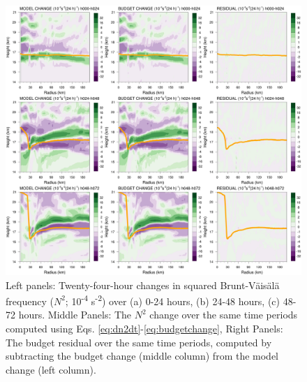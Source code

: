 \documentclass{ametsoc}
\begin{document}
\begin{figure}[ht]
\centerline{\includegraphics[width=39pc]{figures/mod+bud+res.png}}
\caption{Left panels: Twenty-four-hour changes in squared Brunt-V{\"a}is{\"a}l{\"a} frequency ($N^2$; 10\textsuperscript{-4} s\textsuperscript{-2}) over (a) 0-24 hours, (b) 24-48 hours, (c) 48-72 hours.
Middle Panels: The $N^2$ change over the same time periods computed using Eqs. \ref{eq:dn2dt}-\ref{eq:budgetchange}, %
Right Panels: The budget residual over the same time periods, computed by subtracting the budget change (middle column) from the model change (left column).}
\label{fig:mod+bud+res}
\end{figure}
\end{document}

